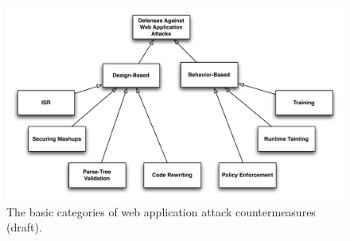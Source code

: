 \documentclass[conference]{IEEEtran}
\begin{document}
\begin{figure}
\begin{center}
\leavevmode
\includegraphics[scale=0.52]{defenses.pdf}
\end{center}
\caption{\label{fig:defenses}The basic categories of web application
attack countermeasures ({\sc draft}).}
\end{figure}
\end{document}
